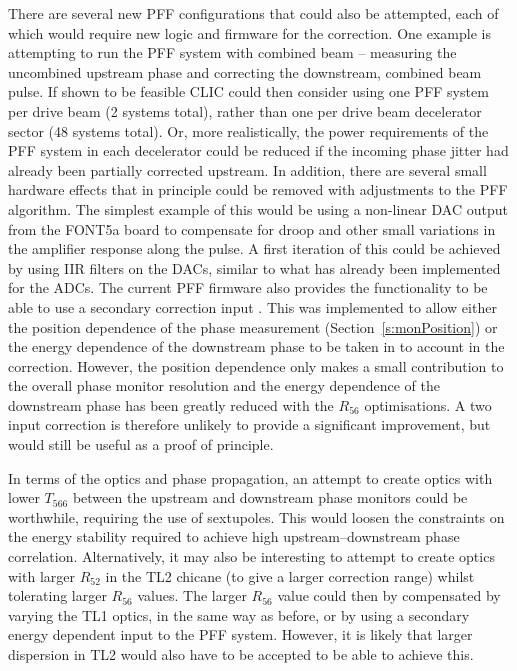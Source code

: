 There are several new PFF configurations that could also be attempted, each of which would require new logic and firmware for the correction. One example is attempting to run the PFF system with combined beam -- measuring the uncombined upstream phase and correcting the downstream, combined beam pulse. 
If shown to be feasible CLIC could then consider using one PFF system per drive beam (2 systems total), rather than one per drive beam decelerator sector (48 systems total). Or, more realistically, the power requirements of the PFF system in each decelerator could be reduced if the incoming phase jitter had already been partially corrected upstream. 
In addition, there are several small hardware effects that in principle could be removed with adjustments to the PFF algorithm. The simplest example of this would be using a non-linear DAC output from the FONT5a board to compensate for droop and other small variations in the amplifier response along the pulse. A first iteration of this could be achieved by using IIR filters on the DACs, similar to what has already been implemented for the ADCs. The current PFF firmware also provides the functionality to be able to use a secondary correction input \cite{glennPriv}. This was implemented to allow either the position dependence of the phase measurement (Section~\ref{s:monPosition}) or the energy dependence of the downstream phase to be taken in to account in the correction. However, the position dependence only makes a small contribution to the overall phase monitor resolution and the energy dependence of the downstream phase has been greatly reduced with the \(R_{56}\) optimisations. A two input correction is therefore unlikely to provide a significant improvement, but would still be useful as a proof of principle.

In terms of the optics and phase propagation, an attempt to create optics with lower \(T_{566}\) between the upstream and downstream phase monitors could be worthwhile, requiring the use of sextupoles. This would loosen the constraints on the energy stability required to achieve high upstream--downstream phase correlation. Alternatively, it may also be interesting to attempt to create optics with larger \(R_{52}\) in the TL2 chicane (to give a larger correction range) whilst tolerating larger \(R_{56}\) values. The larger \(R_{56}\) value could then by compensated by varying the TL1 optics, in the same way as before, or by using a secondary energy dependent input to the PFF system. However, it is likely that larger dispersion in TL2 would also have to be accepted to be able to achieve this. 

